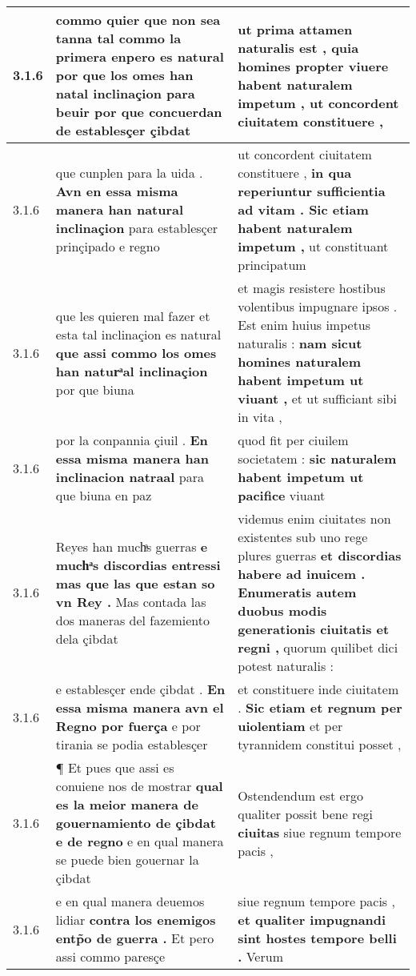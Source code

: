 \begin{tabular}{|p{1cm}|p{6.5cm}|p{6.5cm}|}
3.1.6 & commo quier que non sea tanna tal commo la primera enpero es natural \textbf{ por que los omes han natal inclinaçion para beuir } por que concuerdan de establesçer çibdat & ut prima attamen naturalis est , \textbf{ quia homines propter viuere habent naturalem impetum , } ut concordent ciuitatem constituere , \\\hline
3.1.6 & que cunplen para la uida . \textbf{ Avn en essa misma manera han natural inclinaçion } para establesçer prinçipado e regno & ut concordent ciuitatem constituere , \textbf{ in qua reperiuntur sufficientia ad vitam . Sic etiam habent naturalem impetum , } ut constituant principatum \\\hline
3.1.6 & que les quieren mal fazer et esta tal inclinaçion es natural \textbf{ que assi commo los omes han naturͣal inclinaçion } por que biuna & et magis resistere hostibus volentibus impugnare ipsos . Est enim huius impetus naturalis : \textbf{ nam sicut homines naturalem habent impetum ut viuant , } et ut sufficiant sibi in vita , \\\hline
3.1.6 & por la conpannia çiuil . \textbf{ En essa misma manera han inclinacion natraal } para que biuna en paz & quod fit per ciuilem societatem : \textbf{ sic naturalem habent impetum ut pacifice } viuant \\\hline
3.1.6 & Reyes han muchͣs guerras \textbf{ e muchͣs discordias entressi mas que las que estan so vn Rey . } Mas contada las dos maneras del fazemiento dela çibdat & videmus enim ciuitates non existentes sub uno rege plures guerras \textbf{ et discordias habere ad inuicem . Enumeratis autem duobus modis generationis ciuitatis et regni , } quorum quilibet dici potest naturalis : \\\hline
3.1.6 & e establesçer ende çibdat . \textbf{ En essa misma manera avn el Regno por fuerça } e por tirania se podia establesçer & et constituere inde ciuitatem . \textbf{ Sic etiam et regnum per uiolentiam } et per tyrannidem constitui posset , \\\hline
3.1.6 & ¶ Et pues que assi es conuiene nos de mostrar \textbf{ qual es la meior manera de gouernamiento de çibdat e de regno } e en qual manera se puede bien gouernar la çibdat & Ostendendum est ergo qualiter possit bene regi \textbf{ ciuitas } siue regnum tempore pacis , \\\hline
3.1.6 & e en qual manera deuemos lidiar \textbf{ contra los enemigos entp̃o de guerra . } Et pero assi commo paresçe & siue regnum tempore pacis , \textbf{ et qualiter impugnandi sint hostes tempore belli . } Verum \\\hline

\end{tabular}
